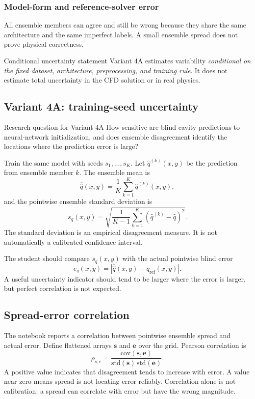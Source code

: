 \documentclass[11pt]{article}
\begin{document}
\subsubsection{Model-form and reference-solver error}
All ensemble members can agree and still be wrong because they share the same architecture and the same imperfect labels. A small ensemble spread does not prove physical correctness.

\begin{definitionbox}{Conditional uncertainty statement}
Variant 4A estimates variability \emph{conditional on the fixed dataset, architecture, preprocessing, and training rule}. It does not estimate total uncertainty in the CFD solution or in real physics.
\end{definitionbox}

\subsection{Variant 4A: training-seed uncertainty}
\begin{projectbox}{Research question for Variant 4A}
How sensitive are blind cavity predictions to neural-network initialization, and does ensemble disagreement identify the locations where the prediction error is large?
\end{projectbox}

Train the same model with seeds $s_1,\ldots,s_K$. Let $\widehat q^{(k)}(x,y)$ be the prediction from ensemble member $k$. The ensemble mean is
\[
\overline{\widehat q}(x,y)=\frac{1}{K}\sum_{k=1}^{K}\widehat q^{(k)}(x,y),
\]
and the pointwise ensemble standard deviation is
\[
s_q(x,y)=
\sqrt{\frac{1}{K-1}
\sum_{k=1}^{K}
\left(\widehat q^{(k)}-\overline{\widehat q}\right)^2}.
\]
The standard deviation is an empirical disagreement measure. It is not automatically a calibrated confidence interval.

The student should compare $s_q(x,y)$ with the actual pointwise blind error
\[
e_q(x,y)=\left|\overline{\widehat q}(x,y)-q_{\mathrm{ref}}(x,y)\right|.
\]
A useful uncertainty indicator should tend to be larger where the error is larger, but perfect correlation is not expected.

\subsection{Spread-error correlation}
The notebook reports a correlation between pointwise ensemble spread and actual error. Define flattened arrays $\mathbf s$ and $\mathbf e$ over the grid. Pearson correlation is
\[
\rho_{s,e}=\frac{\mathrm{cov}(\mathbf s,\mathbf e)}
{\mathrm{std}(\mathbf s)\,\mathrm{std}(\mathbf e)}.
\]
A positive value indicates that disagreement tends to increase with error. A value near zero means spread is not locating error reliably. Correlation alone is not calibration: a spread can correlate with error but have the wrong magnitude.
\end{document}

